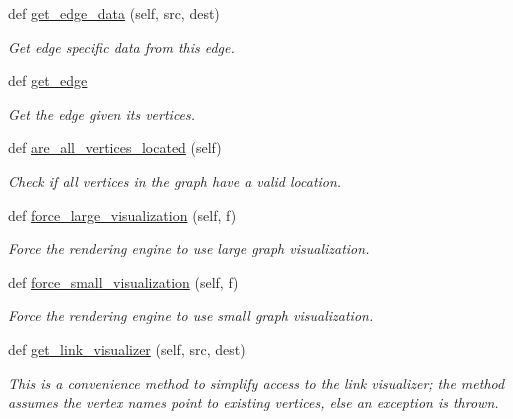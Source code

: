 \begin{DoxyCompactItemize}
def \hyperlink{classbridges_1_1graph__adj__list_1_1_graph_adj_list_abf7a65867ab342ef0eda4a34b3fe011e}{get\+\_\+edge\+\_\+data} (self, src, dest)
\begin{DoxyCompactList}\small\item\em Get edge specific data from this edge. \end{DoxyCompactList}\item 
def \hyperlink{classbridges_1_1graph__adj__list_1_1_graph_adj_list_a2f4c60fcaa52adcb509b3bb8138bc3a1}{get\+\_\+edge}
\begin{DoxyCompactList}\small\item\em Get the edge given its vertices. \end{DoxyCompactList}\item 
def \hyperlink{classbridges_1_1graph__adj__list_1_1_graph_adj_list_a9041f2a5c754141afbc41f02c6a2771c}{are\+\_\+all\+\_\+vertices\+\_\+located} (self)
\begin{DoxyCompactList}\small\item\em Check if all vertices in the graph have a valid location. \end{DoxyCompactList}\item 
def \hyperlink{classbridges_1_1graph__adj__list_1_1_graph_adj_list_aa0eaa5a21f8d8905d02454a83151c20e}{force\+\_\+large\+\_\+visualization} (self, f)
\begin{DoxyCompactList}\small\item\em Force the rendering engine to use large graph visualization. \end{DoxyCompactList}\item 
def \hyperlink{classbridges_1_1graph__adj__list_1_1_graph_adj_list_a036b6368bf916474da748e96dd93ec5a}{force\+\_\+small\+\_\+visualization} (self, f)
\begin{DoxyCompactList}\small\item\em Force the rendering engine to use small graph visualization. \end{DoxyCompactList}\item 
def \hyperlink{classbridges_1_1graph__adj__list_1_1_graph_adj_list_abaa3015ae78e0f5ebc6fd2d2d2772927}{get\+\_\+link\+\_\+visualizer} (self, src, dest)
\begin{DoxyCompactList}\small\item\em This is a convenience method to simplify access to the link visualizer; the method assumes the vertex names point to existing vertices, else an exception is thrown. \end{DoxyCompactList}\item 

\end{DoxyCompactItemize}
